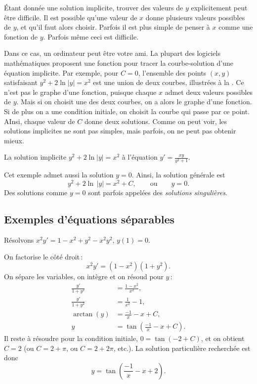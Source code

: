 Étant donnée une solution implicite, trouver des valeurs de $y$ explicitement peut être difficile.  Il est possible qu'une valeur de $x$ donne plusieurs valeurs possibles de $y$, et qu'il faut alors choisir.  Parfois il est plus simple de penser à $x$ comme une fonction de $y$.  Parfois même ceci est difficile.

Dans ce cas, un ordinateur peut être votre ami.  La plupart des logiciels mathématiques proposent une fonction pour tracer la courbe-solution d'une équation implicite.  Par exemple, pour $C=0$, l'ensemble des points $(x,y)$ satisfaisant $y^2+2\ln|y|=x^2$ 
est une union de deux courbes, illustrées à la .  Ce n'est pas le graphe d'une fonction, puisque chaque $x$ admet deux valeurs possibles de $y$.  Mais si on choisit une des deux courbes, on a alors le graphe d'une fonction.  Si de plus on a une condition initiale, on choisit la courbe qui passe par ce point.  AInsi, chaque valeur de $C$ donne deux solutions.  Comme on peut voir, les solutions implicites ne sont pas simples, mais parfois, on ne peut pas obtenir mieux.

\begin{myfig}
\capstart
{}
\caption{La solution implicite $y^2+2\ln|y|=x^2$ à l'équation $y'=\frac{xy}{y^2+1}$.\label{implicitsols:fig}}
\end{myfig}

Cet exemple admet aussi la solution $y=0$.
Ainsi, la solution générale est 
\begin{equation*}
y^2 + 2 \ln \, \lvert y \rvert = x^2 + C, \qquad \text{ou} \qquad y=0.
\end{equation*}
Des solutions comme $y=0$
sont parfois appelées des \emph{solutions singulières}.

\subsection{Exemples d'équations séparables}

\begin{example}
Résolvons $x^2y' = 1 - x^2+y^2 - x^2y^2$, $y(1) = 0$.

On factorise le côté droit\,: 
\begin{equation*}
x^2y' = (1 - x^2)(1+y^2) .
\end{equation*}
On sépare les variables, on intègre et on résoud pour $y$\,: 
\begin{align*}
\frac{y'}{1+y^2} & = \frac{1 - x^2}{x^2} , \\
\frac{y'}{1+y^2} & = \frac{1}{x^2} - 1 , \\
\operatorname{arctan} (y) & = \frac{-1}{x} - x + C , \\
y & = \tan \left(\frac{-1}{x} - x + C\right) .
\end{align*}
Il reste à résoudre pour la condition initiale,
 $0 = \tan(-2+C)$, et on obtient $C=2$ (ou $C = 2 +
\pi$, ou $C = 2 + 2\pi$, etc.).  La solution particulière recherchée est donc
\begin{equation*}
y = \tan \left(\frac{-1}{x} - x + 2 \right) .
\end{equation*}
\end{example}


